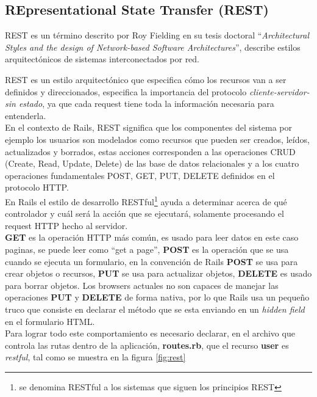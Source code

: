     \subsection{REpresentational State Transfer (REST)} %
    \label{sub:rest}
      REST es un término descrito por Roy Fielding en su tesis doctoral ``\emph{Architectural Styles and the design of Network-based Software Architectures}''\cite{web6}, describe estilos arquitectónicos de sistemas interconectados por red.

      REST es un estilo arquitectónico que especifica cómo los recursos van a ser definidos y direccionados, especifica la importancia del protocolo \emph{cliente-servidor-sin estado}, ya que cada request tiene toda la información necesaria para entenderla.\\

      En el contexto de Rails, REST significa que los componentes del sistema por ejemplo los usuarios son modelados como recursos que pueden ser creados, leídos, actualizados y borrados, estas acciones corresponden a las operaciones CRUD (Create, Read, Update, Delete) de las base de datos relacionales  y a los cuatro operaciones fundamentales POST, GET, PUT, DELETE definidos en el  protocolo HTTP.\\

      En Rails el estilo de desarrollo RESTful\footnote{se denomina RESTful a los sistemas que siguen los principios REST} ayuda a determinar acerca de qué controlador y cuál será la acción que se ejecutará, solamente procesando el request HTTP hecho al servidor.\\

      \textbf{GET} es la operación HTTP más común, es usado para leer 
      datos en este caso paginas, se puede leer como ``get a page'', 
      \textbf{POST} es la operación que se usa cuando se ejecuta un formulario, 
      en la convención de Rails \textbf{POST} se usa para crear 
      objetos o recursos, \textbf{PUT} se usa para actualizar objetos, 
      \textbf{DELETE} es usado para borrar objetos.  Los browsers actuales no son capaces 
      de manejar las operaciones \textbf{PUT} y \textbf{DELETE} de forma nativa, 
      por lo que Rails usa un pequeño truco que consiste en declarar el método 
      que se esta enviando en un \emph{hidden field} en el formulario HTML.\\

      Para lograr todo este comportamiento  es necesario declarar, en el archivo 
      que controla las rutas dentro de la aplicación, \textbf{routes.rb}, que el 
      recurso \textbf{user} es \emph{restful}, tal como se muestra en la figura \ref{fig:rest}\\

